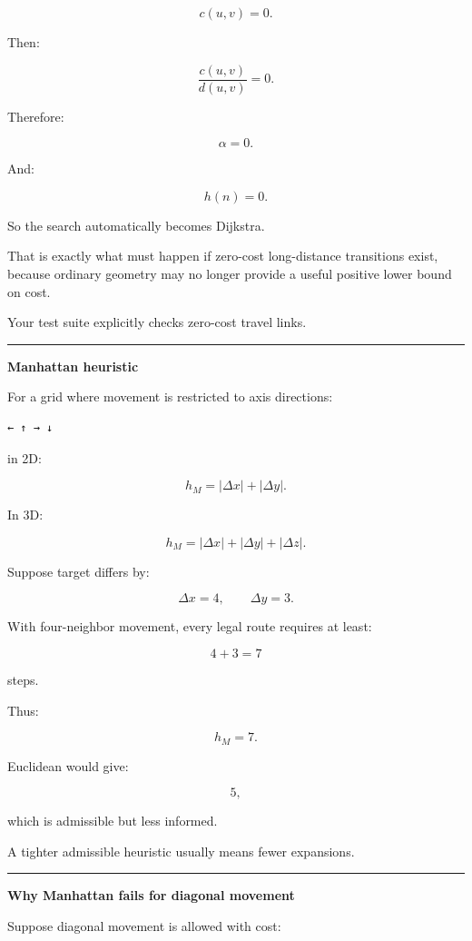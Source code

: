 \[
c(u,v)=0.
\]

Then:

\[
\frac{c(u,v)}{d(u,v)}
=
0.
\]

Therefore:

\[
\alpha=0.
\]

And:

\[
h(n)=0.
\]

So the search automatically becomes Dijkstra.

That is exactly what must happen if zero-cost long-distance transitions exist, because ordinary geometry may no longer provide a useful positive lower bound on cost.

Your test suite explicitly checks zero-cost travel links.

\begin{center}\rule{0.5\linewidth}{0.5pt}\end{center}

\textbf{Manhattan heuristic}

For a grid where movement is restricted to axis directions:

\begin{verbatim}
← ↑ → ↓
\end{verbatim}

in 2D:

\[
\boxed{
h_M=
|\Delta x|+|\Delta y|.
}
\]

In 3D:

\[
h_M=
|\Delta x|+
|\Delta y|+
|\Delta z|.
\]

Suppose target differs by:

\[
\Delta x=4,
\qquad
\Delta y=3.
\]

With four-neighbor movement, every legal route requires at least:

\[
4+3=7
\]

steps.

Thus:

\[
h_M=7.
\]

Euclidean would give:

\[
5,
\]

which is admissible but less informed.

A tighter admissible heuristic usually means fewer expansions.

\begin{center}\rule{0.5\linewidth}{0.5pt}\end{center}

\textbf{Why Manhattan fails for diagonal movement}

Suppose diagonal movement is allowed with cost:

